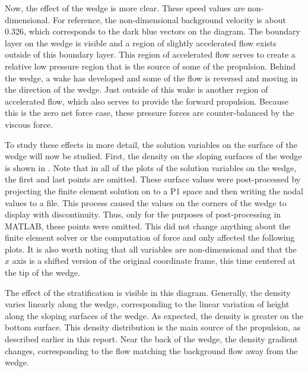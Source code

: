 \documentclass[12pt]{article}
\begin{document}
Now, the effect of the wedge is more clear. These speed values are non-dimensional. For reference, the non-dimensional background velocity is about 0.326, which corresponds to the dark blue vectors on the diagram. The boundary layer on the wedge is visible and a region of slightly accelerated flow exists outside of this boundary layer. This region of accelerated flow serves to create a relative low pressure region that is the source of some of the propulsion. Behind the wedge, a wake has developed and some of the flow is reversed and moving in the direction of the wedge. Just outside of this wake is another region of accelerated flow, which also serves to provide the forward propulsion. Because this is the zero net force case, these pressure forces are counter-balanced by the viscous force.

To study these effects in more detail, the solution variables on the surface of the wedge will now be studied. First, the density on the sloping surfaces of the wedge is shown in . Note that in all of the plots of the solution variables on the wedge, the first and last points are omitted. These surface values were post-processed by projecting the finite element solution on to a P1 space and then writing the nodal values to a file. This process caused the values on the corners of the wedge to display with discontinuity. Thus, only for the purposes of post-processing in \textsf{MATLAB}, these points were omitted. This did not change anything about the finite element solver or the computation of force and only affected the following plots. It is also worth noting that all variables are non-dimensional and that the $x$ axis is a shifted version of the original coordinate frame, this time centered at the tip of the wedge.


The effect of the stratification is visible in this diagram. Generally, the density varies linearly along the wedge, corresponding to the linear variation of height along the sloping surfaces of the wedge. As expected, the density is greater on the bottom surface. This density distribution is the main source of the propulsion, as described earlier in this report. Near the back of the wedge, the density gradient changes, corresponding to the flow matching the background flow away from the wedge.
\end{document}
